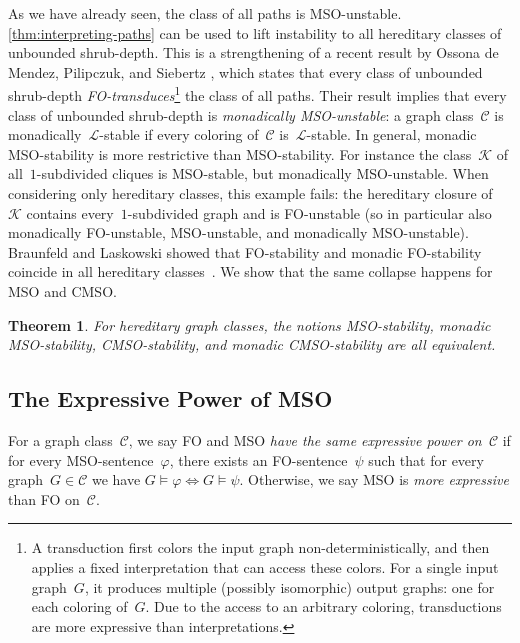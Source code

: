 \documentclass[11pt]{article}      \usepackage[margin=1in]{geometry}  \usepackage{microtype}
\newtheorem{theorem}{Theorem}[section]
\theoremstyle{definition}
\renewcommand{\phi}{\varphi}
\newcommand{\LL}{\mathcal{L}}
\newcommand{\CC}{\mathcal{C}}
\newcommand{\KK}{\mathcal{K}}
\begin{document}
As we have already seen, the class of all paths is MSO-unstable. \cref{thm:interpreting-paths} can be used to lift instability to all hereditary classes of unbounded shrub-depth.
This is a strengthening of a recent result by Ossona de Mendez, Pilipczuk, and Siebertz \cite{shrubtrans}, which states that every class of unbounded shrub-depth \emph{FO-transduces}\footnote{A transduction first colors the input graph non-deterministically, and then applies a fixed interpretation that can access these colors. For a single input graph~$G$, it produces multiple (possibly isomorphic) output graphs: one for each coloring of~$G$.
Due to the access to an arbitrary coloring, transductions are more expressive than interpretations.} the class of all paths.
Their result implies that every class of unbounded shrub-depth is \emph{monadically MSO-unstable}:
a graph class~$\CC$ is monadically~$\LL$-stable if every coloring of~$\CC$ is~$\LL$-stable.
In general, monadic MSO-stability is more restrictive than MSO-stability.
For instance the class~$\KK$ of all~$1$-subdivided cliques is MSO-stable, but monadically MSO-unstable.
When considering only hereditary classes, this example fails: the hereditary closure of~$\KK$ contains every~$1$-subdivided graph and is FO-unstable (so in particular also monadically FO-unstable, MSO-unstable, and monadically MSO-unstable).
Braunfeld and Laskowski showed that FO-stability and monadic FO-stability coincide in all hereditary classes~\cite{braunfeld2022existential}.
We show that the same collapse happens for MSO and CMSO.

\begin{theorem}
  For hereditary graph classes, the notions MSO-stability, monadic MSO-stability, CMSO-stability, and monadic CMSO-stability are all equivalent.
\end{theorem}

\subsection*{The Expressive Power of MSO}
For a graph class~$\CC$, we say FO and MSO \emph{have the same expressive power on~$\CC$} if for every MSO-sentence~$\phi$, there exists an FO-sentence~$\psi$ such that for every graph~$G\in\CC$ we have
$G \models \phi \Leftrightarrow G \models \psi$.
Otherwise, we say MSO is \emph{more expressive} than FO on~$\CC$.
\end{document}
